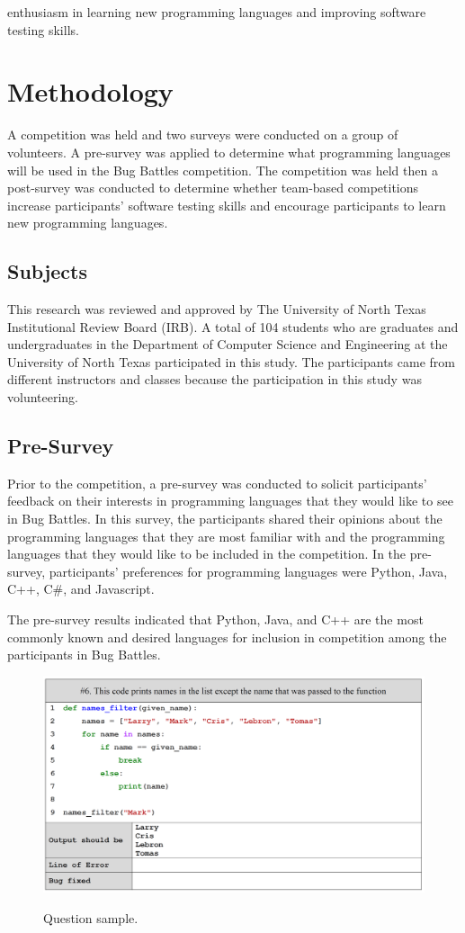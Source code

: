 \documentclass{article}
\begin{document}
enthusiasm in learning new programming languages and improving software testing skills.


\section{Methodology} \label{section:methodology}
A competition was held and two surveys were conducted on a group of volunteers. A pre-survey was applied to determine what programming languages will be used in the Bug Battles competition. The competition was held then a post-survey was conducted to determine whether team-based competitions increase participants’ software testing skills and encourage participants to learn new programming languages.

\subsection{Subjects}
This research was reviewed and approved by The University of North Texas Institutional Review Board (IRB). A total of 104 students who are graduates and undergraduates in the Department of Computer Science and Engineering at the University of North Texas participated in this study. The participants came from different instructors and classes because the participation in this study was volunteering.

\subsection{Pre-Survey}
Prior to the competition, a pre-survey was conducted to solicit participants' feedback on their interests in programming languages that they would like to see in Bug Battles. In this survey, the participants shared their opinions about the programming languages that they are most familiar with and the programming languages that they would like to be included in the competition. In the pre-survey, participants' preferences for programming languages were Python, Java, C++, C\#, and Javascript.

The pre-survey results indicated that Python, Java, and C++ are the most commonly known and desired languages for inclusion in competition among the participants in Bug Battles.

\begin{figure}[!h]
{\includegraphics[width=\textwidth]{241_1.png}}
\caption{Question sample.}
\label{problemSample}
\end{figure}
\end{document}
